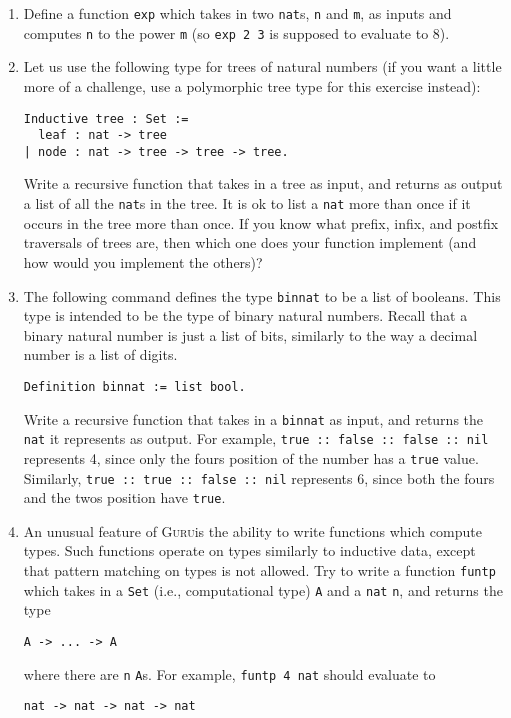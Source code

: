 \documentclass{book}[12pt]
\newcommand{\guru}[0]{\textsc{Guru}}
\begin{document}
\begin{enumerate}
\item Define a function \texttt{exp} which takes in two \texttt{nat}s,
\texttt{n} and \texttt{m}, as inputs and computes \texttt{n} to the power
\texttt{m} (so \texttt{exp 2 3} is supposed to evaluate to 8).

\item Let us use the following type for trees of natural numbers (if
you want a little more of a challenge, use a polymorphic tree type for
this exercise instead):

\begin{verbatim}
Inductive tree : Set :=
  leaf : nat -> tree
| node : nat -> tree -> tree -> tree.
\end{verbatim}

\noindent Write a recursive function that takes in a tree as input,
and returns as output a list of all the \texttt{nat}s in the tree.  It
is ok to list a \texttt{nat} more than once if it occurs in the tree
more than once.  If you know what prefix, infix, and postfix
traversals of trees are, then which one does your function implement
(and how would you implement the others)?

\item The following command defines the type \texttt{binnat} to be a
list of booleans.  This type is intended to be the type of binary
natural numbers.  Recall that a binary natural number is just a list
of bits, similarly to the way a decimal number is a list of digits.

\begin{verbatim}
Definition binnat := list bool.
\end{verbatim}

\noindent Write a recursive function that takes in a \texttt{binnat}
as input, and returns the \texttt{nat} it represents as output.  For
example, \texttt{true :: false :: false :: nil} represents 4, since
only the fours position of the number has a \texttt{true} value.
Similarly, \texttt{true :: true :: false :: nil} represents 6, since
both the fours and the twos position have \texttt{true}.

\item An unusual feature of \guru is the ability to write functions
which compute types.  Such functions operate on types similarly to
inductive data, except that pattern matching on types is not allowed.
Try to write a function \texttt{funtp} which takes in a \texttt{Set}
(i.e., computational type) \texttt{A} and a \texttt{nat} \texttt{n},
and returns the type

\begin{verbatim}
A -> ... -> A
\end{verbatim}

\noindent where there are \texttt{n} \texttt{A}s.  For example,
\texttt{funtp 4 nat} should evaluate to

\begin{verbatim}
nat -> nat -> nat -> nat
\end{verbatim}

\end{enumerate}
\end{document}
